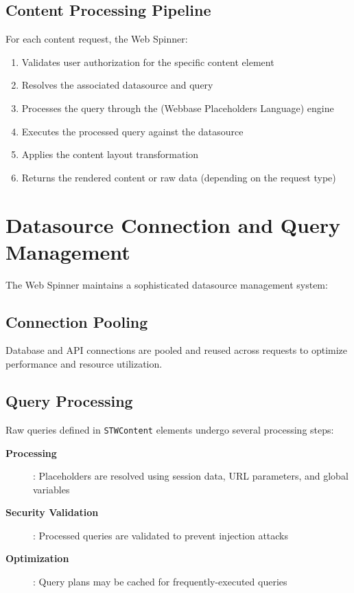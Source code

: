 \subsection{Content Processing Pipeline}

For each content request, the Web Spinner:
\begin{enumerate}
	\item Validates user authorization for the specific content element
	\item Resolves the associated datasource and query
	\item Processes the query through the \wbpl{} (Webbase Placeholders Language) engine
	\item Executes the processed query against the datasource
	\item Applies the content layout transformation
	\item Returns the rendered content or raw data (depending on the request type)
\end{enumerate}

\section{Datasource Connection and Query Management}
\label{sec:datasource-management}

The Web Spinner maintains a sophisticated datasource management system:

\subsection{Connection Pooling}

Database and API connections are pooled and reused across requests to optimize performance and resource utilization.

\subsection{Query Processing}

Raw queries defined in \texttt{STWContent} elements undergo several processing steps:

\begin{description}
	\item[\textbf{\wbpl{} Processing}]: Placeholders are resolved using session data, URL parameters, and global variables
	\item[\textbf{Security Validation}]: Processed queries are validated to prevent injection attacks
	\item[\textbf{Optimization}]: Query plans may be cached for frequently-executed queries
\end{description}

